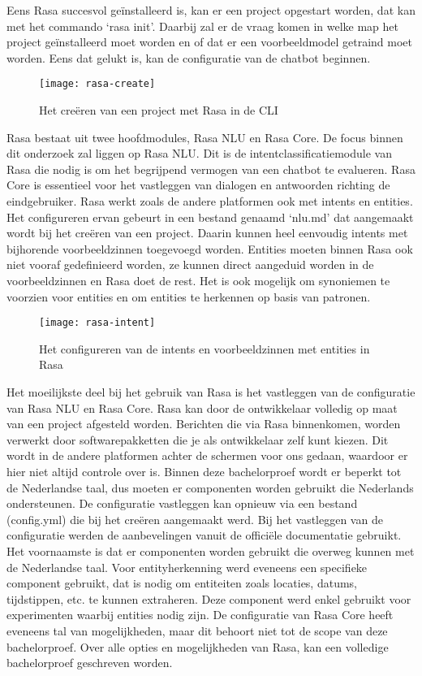 Eens Rasa succesvol geïnstalleerd is, kan er een project opgestart worden, dat kan met het commando ‘rasa init’. Daarbij zal er de vraag komen in welke map het project geïnstalleerd moet worden en of dat er een voorbeeldmodel getraind moet worden. Eens dat gelukt is, kan de configuratie van de chatbot beginnen.

\begin{figure}[H]
    \label{fig:rasa-create}
    \centering
    \texttt{[image: rasa-create]}
    \caption{Het creëren van een project met Rasa in de CLI}
\end{figure}

Rasa bestaat uit twee hoofdmodules, Rasa NLU en Rasa Core. De focus binnen dit onderzoek zal liggen op Rasa NLU. Dit is de intentclassificatiemodule van Rasa die nodig is om het begrijpend vermogen van een chatbot te evalueren. Rasa Core is essentieel voor het vastleggen van dialogen en antwoorden richting de eindgebruiker. Rasa werkt zoals de andere platformen ook met intents en entities. Het configureren ervan gebeurt in een bestand genaamd ‘nlu.md’ dat aangemaakt wordt bij het creëren van een project. Daarin kunnen heel eenvoudig intents met bijhorende voorbeeldzinnen toegevoegd worden. Entities moeten binnen Rasa ook niet vooraf gedefinieerd worden, ze kunnen direct aangeduid worden in de voorbeeldzinnen en Rasa doet de rest. Het is ook mogelijk om synoniemen te voorzien voor entities en om entities te herkennen op basis van patronen.

\begin{figure}[H]
    \label{fig:rasa-intent}
    \centering
    \texttt{[image: rasa-intent]}
    \caption{Het configureren van de intents en voorbeeldzinnen met entities in Rasa}
\end{figure}

Het moeilijkste deel bij het gebruik van Rasa is het vastleggen van de configuratie van Rasa NLU en Rasa Core. Rasa kan door de ontwikkelaar volledig op maat van een project afgesteld worden. Berichten die via Rasa binnenkomen, worden verwerkt door softwarepakketten die je als ontwikkelaar zelf kunt kiezen. Dit wordt in de andere platformen achter de schermen voor ons gedaan, waardoor er hier niet altijd controle over is. Binnen deze bachelorproef wordt er beperkt tot de Nederlandse taal, dus moeten er componenten worden gebruikt die Nederlands ondersteunen. De configuratie vastleggen kan opnieuw via een bestand (config.yml) die bij het creëren aangemaakt werd. Bij het vastleggen van de configuratie werden de aanbevelingen vanuit de officiële documentatie gebruikt. Het voornaamste is dat er componenten worden gebruikt die overweg kunnen met de Nederlandse taal. Voor entityherkenning werd eveneens een specifieke component gebruikt, dat is nodig om entiteiten zoals locaties, datums, tijdstippen, etc. te kunnen extraheren. Deze component werd enkel gebruikt voor experimenten waarbij entities nodig zijn. De configuratie van Rasa Core heeft eveneens tal van mogelijkheden, maar dit behoort niet tot de scope van deze bachelorproef. Over alle opties en mogelijkheden van Rasa, kan een volledige bachelorproef geschreven worden. 

